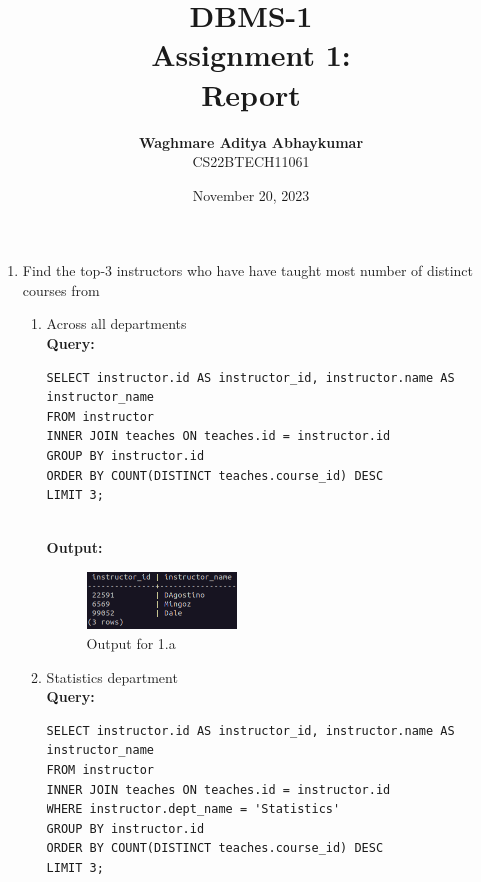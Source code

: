 \documentclass[12pt]{article}
\begin{document}
\title{ 
	DBMS-1\\
	Assignment 1:\\
    Report
}
\author{\textbf{Waghmare Aditya Abhaykumar}\\
    CS22BTECH11061}
\date{November 20, 2023}
\maketitle


\begin{enumerate}[label=\textbf{\arabic*:}, left=0pt, labelsep=10pt, align=left, parsep=0pt, itemsep=10pt]
    \item Find the top-3 instructors who have have taught most number of distinct courses from

        \begin{enumerate}[label=\textbf{\alph*.}, align=left, parsep=0pt, itemsep=10pt]
            \item Across all departments
            \\ \textbf{Query:}
            \begin{lstlisting}
SELECT instructor.id AS instructor_id, instructor.name AS instructor_name
FROM instructor
INNER JOIN teaches ON teaches.id = instructor.id
GROUP BY instructor.id
ORDER BY COUNT(DISTINCT teaches.course_id) DESC
LIMIT 3;
            \end{lstlisting}

            \\ \textbf{Output:}
            \begin{figure}[H]
                \hspace{60pt}
                \includegraphics[width=0.4\textwidth]{images/1_a.png}
                \caption{Output for 1.a}
            \end{figure}

            \item Statistics department  
            \\ \textbf{Query:}
            \begin{lstlisting}
SELECT instructor.id AS instructor_id, instructor.name AS instructor_name
FROM instructor
INNER JOIN teaches ON teaches.id = instructor.id 
WHERE instructor.dept_name = 'Statistics'
GROUP BY instructor.id
ORDER BY COUNT(DISTINCT teaches.course_id) DESC
LIMIT 3;
            \end{lstlisting}


\end{enumerate}
\end{enumerate}
\end{document}
